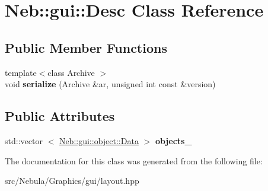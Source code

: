 \hypertarget{classNeb_1_1gui_1_1Desc}{\section{\-Neb\-:\-:gui\-:\-:\-Desc \-Class \-Reference}
\label{classNeb_1_1gui_1_1Desc}
}
\subsection*{\-Public \-Member \-Functions}
\begin{DoxyCompactItemize}
\item 
\hypertarget{classNeb_1_1gui_1_1Desc_a5aae51e52408a32f69ead4d54488bc87}{{\footnotesize template$<$class Archive $>$ }\\void {\bfseries serialize} (\-Archive \&ar, unsigned int const \&version)}\label{classNeb_1_1gui_1_1Desc_a5aae51e52408a32f69ead4d54488bc87}

\end{DoxyCompactItemize}
\subsection*{\-Public \-Attributes}
\begin{DoxyCompactItemize}
\item 
\hypertarget{classNeb_1_1gui_1_1Desc_a5af69712626f602b008ccb1c4e0c287f}{std\-::vector\*
$<$ \hyperlink{classNeb_1_1gui_1_1object_1_1Data}{\-Neb\-::gui\-::object\-::\-Data} $>$ {\bfseries objects\-\_\-}}\label{classNeb_1_1gui_1_1Desc_a5af69712626f602b008ccb1c4e0c287f}

\end{DoxyCompactItemize}


\-The documentation for this class was generated from the following file\-:\begin{DoxyCompactItemize}
\item 
src/\-Nebula/\-Graphics/gui/layout.\-hpp\end{DoxyCompactItemize}
